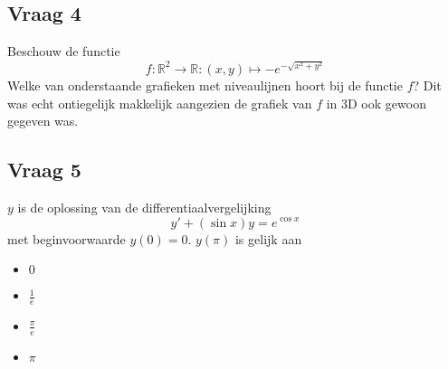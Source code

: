 \documentclass[kulak]{kulakarticle} %
\newcommand{\R}{\mathbb{R}}
\begin{document}
	\subsection*{Vraag 4}

	Beschouw de functie \[ f : \R^2 \to \R : (x,y) \mapsto -e^{-\sqrt{x^2+y^2}} \]
	Welke van onderstaande grafieken met niveaulijnen hoort bij de functie \(f\)? Dit was echt ontiegelijk makkelijk aangezien de grafiek van \(f\) in 3D ook gewoon gegeven was.

	\subsection*{Vraag 5}

	\(y\) is de oplossing van de differentiaalvergelijking \[ y' + (\sin{x})y = e^{\cos{x}} \] met beginvoorwaarde \(y(0)=0\). \(y(\pi)\) is gelijk aan
	\begin{itemize}
		\item \(0\)
		\item \(\frac{1}{e}\)
		\item \(\frac{\pi}{e}\)
		\item \(\pi\)
	\end{itemize}
\end{document}
